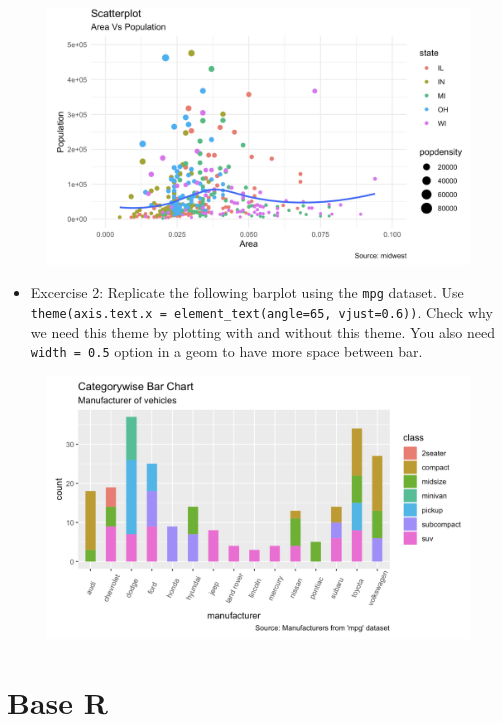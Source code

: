 \documentclass[]{book}
\providecommand{\tightlist}{%
  \setlength{\itemsep}{0pt}\setlength{\parskip}{0pt}}
\begin{document}
\begin{figure}[htbp]
\centering
\includegraphics{practice1.png}
\caption{}
\end{figure}

\begin{itemize}
\tightlist
\item
  Excercise 2: Replicate the following barplot using the \texttt{mpg}
  dataset. Use
  \texttt{theme(axis.text.x\ =\ element\_text(angle=65,\ vjust=0.6))}.
  Check why we need this theme by plotting with and without this theme.
  You also need \texttt{width\ =\ 0.5} option in a geom to have more
  space between bar.
\end{itemize}

\begin{figure}[htbp]
\centering
\includegraphics{practice2.png}
\caption{}
\end{figure}

\chapter{Base R}\label{base-r}
\end{document}
